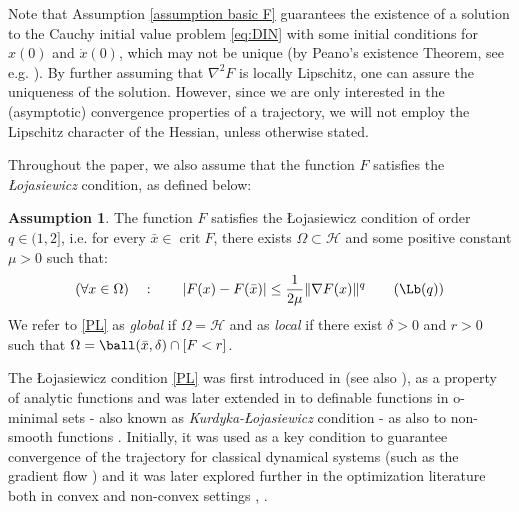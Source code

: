 \documentclass[reqno]{amsart}
\theoremstyle{plain}
\theoremstyle{definition}
\newtheorem{assumption}{Assumption}	%
\theoremstyle{remark}
\newcommand{\remove}[1]{{\color{gray}#1}}	%
\DeclarePairedDelimiter{\abs}{\lvert}{\rvert}	%
\DeclareMathOperator*{\argmin}{arg\,min}	%
\DeclareMathOperator{\crit}{crit}	%
\DeclarePairedDelimiter{\norm}{\lVert}{\rVert}	%
\newcommand{\VA}{\VAcomment}
\newcommand{\Bl}[1]{\ball\mathopen{}\left(#1\right)}
\newcommand{\Hb}{\mathcal{H}}
\begin{document}
Note that  Assumption \ref{assumption basic F} guarantees the existence of a solution to the Cauchy initial value problem \eqref{eq:DIN} with some initial conditions for $x(0)$ and $\dot{x}(0)$, which may not be unique (by Peano's existence Theorem, see e.g. \cite{teschl2012ordinary}). By further assuming that $\nabla^{2}F$ is locally Lipschitz, one can assure the uniqueness of the solution. However, since we are only interested in the (asymptotic) convergence properties of a trajectory, we will not employ the Lipschitz character of the Hessian, unless otherwise stated.



Throughout the paper, we also assume that the function $F$ satisfies the \textit{\L ojasiewicz} condition, as defined below:
\begin{assumption}
\label{asm:KL}
\label{definition PL}
The function $F$ satisfies the \L ojasiewicz condition of order $q\in(1,2]$, i.e. for every $\bar{x}\in \crit{F}$, there exists $\Omega\subset \Hb$ and some positive constant $\mu>0$ such that:
\begin{equation}\label{PL}
(\forall x\in \Omega) \quad : \qquad \abs{F(x)-F(\bar{x})} \leq \frac{1}{2\mu}\norm{\nabla F(x)}^{q} \tag{$\Lb(q)$}
\end{equation}
We refer to \ref{PL} as \textit{global} if $\Omega =\Hb$ and as \textit{local} if there exist $\delta>0$ and $r>0$ such that $\Omega = \Bl{\bar{x},\delta}\cap[F < r]$.
\end{assumption}


The \L ojasiewicz condition \ref{PL} was first introduced in \cite{Loja63} (see also \cite{polyak1964some,Loja93}), as a property of analytic functions and was later extended in \cite{Kurdyka1998} to definable functions in o-minimal sets - also known as \emph{Kurdyka-\L ojasiewicz} condition - as also to non-smooth functions \cite{bolte2007lojasiewicz,bolte2007clarke,bolte2010characterizations}.
Initially, it was used as a key condition to guarantee convergence of the trajectory for classical dynamical systems (such as the gradient flow \cite{Loja63}) and it was later explored further in the optimization literature both in convex \cite{garrigos2017convergence,bolte2017error,bolte2007lojasiewicz,bolte2010characterizations,aujol2023convergencePL,aujol2023fast} and non-convex settings \cite{polyak1963gradient,polyak1964some,polyak2017lyapunov}, \cite{attouch2010proximal,attouch2013convergence,begout2015damped,Karimi2016,necoara2019linear,drusvyatskiy2018error,zhang2020new}. 
\end{document}
